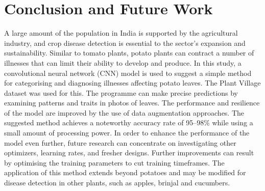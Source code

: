 \documentclass[conference]{IEEEtran}
\begin{document}
\section{Conclusion and Future Work}
A large amount of the population in India is supported by the agricultural industry, and crop disease detection is essential to the sector's expansion and sustainability. Similar to tomato plants, potato plants can contract a number of illnesses that can limit their ability to develop and produce. In this study, a convolutional neural network (CNN) model is used to suggest a simple method for categorising and diagnosing illnesses affecting potato leaves. The Plant Village dataset was used for this. The programme can make precise predictions by examining patterns and traits in photos of leaves. The performance and resilience of the model are improved by the use of data augmentation approaches. The suggested method achieves a noteworthy accuracy rate of 95–98\% while using a small amount of processing power. In order to enhance the performance of the model even further, future research can concentrate on investigating other optimizers, learning rates, and fresher designs. Further improvements can result by optimising the training parameters to cut training timeframes. The application of this method extends beyond potatoes and may be modified for disease detection in other plants, such as apples, brinjal and cucumbers.



\end{document}
